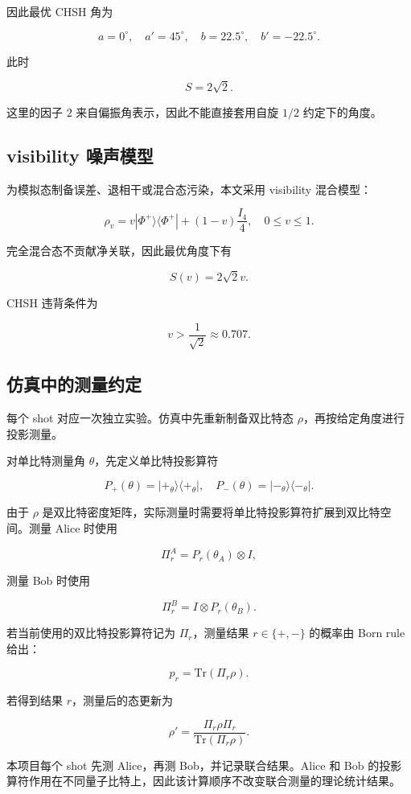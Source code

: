 \documentclass{zjureport}
\begin{document}
因此最优 CHSH 角为

\[
a=0^\circ,\quad a'=45^\circ,\quad b=22.5^\circ,\quad b'=-22.5^\circ.
\]

此时

\[
S=2\sqrt{2}.
\]

这里的因子 \(2\) 来自偏振角表示，因此不能直接套用自旋 \(1/2\) 约定下的角度。

\subsection{visibility 噪声模型}\label{visibility-ux566aux58f0ux6a21ux578b}

为模拟态制备误差、退相干或混合态污染，本文采用 visibility 混合模型：

\[
\rho_v=v|\Phi^+\rangle\langle\Phi^+|+(1-v)\frac{I_4}{4},
\quad 0\leq v\leq1.
\]

完全混合态不贡献净关联，因此最优角度下有

\[
S(v)=2\sqrt{2}v.
\]

CHSH 违背条件为

\[
v>\frac{1}{\sqrt{2}}\approx0.707.
\]

\subsection{仿真中的测量约定}\label{ux4effux771fux4e2dux7684ux6d4bux91cfux7ea6ux5b9a}

每个 shot 对应一次独立实验。仿真中先重新制备双比特态 \(\rho\)，再按给定角度进行投影测量。

对单比特测量角 \(\theta\)，先定义单比特投影算符

\[
P_+(\theta)=|+_\theta\rangle\langle+_\theta|,
\quad
P_-(\theta)=|-_\theta\rangle\langle-_\theta|.
\]

由于 \(\rho\) 是双比特密度矩阵，实际测量时需要将单比特投影算符扩展到双比特空间。测量 Alice 时使用

\[
\Pi_r^A=P_r(\theta_A)\otimes I,
\]

测量 Bob 时使用

\[
\Pi_r^B=I\otimes P_r(\theta_B).
\]

若当前使用的双比特投影算符记为 \(\Pi_r\)，测量结果 \(r\in\{+,-\}\) 的概率由 Born rule 给出：

\[
p_r=\mathrm{Tr}(\Pi_r\rho).
\]

若得到结果 \(r\)，测量后的态更新为

\[
\rho'=\frac{\Pi_r\rho\Pi_r}{\mathrm{Tr}(\Pi_r\rho)}.
\]

本项目每个 shot 先测 Alice，再测 Bob，并记录联合结果。Alice 和 Bob 的投影算符作用在不同量子比特上，因此该计算顺序不改变联合测量的理论统计结果。
\end{document}
